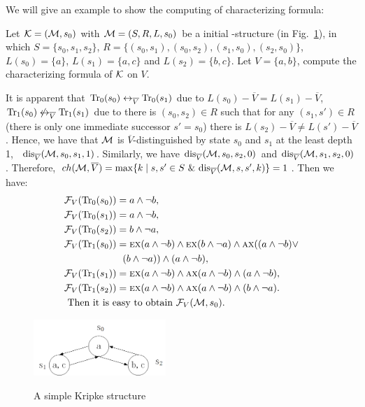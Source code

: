 \documentclass{article}
\begin{document}
We will give an example to show the computing of characterizing formula:
\begin{example}
Let ${\cal K} = ({\cal M}, s_0)$ with ${\cal M}=(S, R, L,s_0)$ be a initial \MPK-structure (in Fig.~\ref{Kripke_1}), in which $S=\{s_0, s_1, s_2\}$, $R=\{(s_0, s_1), (s_0, s_2), (s_1, s_0), (s_2, s_0)\}$, $L(s_0)= \{a\}$, $L(s_1) =\{a,c\}$ and $L(s_2) = \{b,c\}$. Let $V=\{a, b\}$, compute the characterizing formula of ${\cal K}$ on $V$.

It is apparent that $\textrm{Tr}_0(s_0) \leftrightarrow_{\overline V} \textrm{Tr}_0(s_1)$ due to $L(s_0) - \overline V = L(s_1) -\overline V$, $\textrm{Tr}_1(s_0) \not\leftrightarrow_{\overline V} \textrm{Tr}_1(s_1)$ due to there is $(s_0, s_2)\in R$ such that for any $(s_1, s') \in R$ (there is only one immediate successor $s'=s_0$) there is $L(s_2) - \overline V \neq L(s') - \overline V$. Hence, we have that ${\cal M}$ is $\overline V$-distinguished by state $s_0$ and $s_1$ at the least depth 1, \ie\ $\textrm{dis}_{\overline V}({\cal M}, s_0, s_1, 1)$. Similarly, we have $\textrm{dis}_{\overline V}({\cal M}, s_0, s_2, 0)$ and $\textrm{dis}_{\overline V}({\cal M}, s_1, s_2, 0)$. Therefore, $ch({\cal M}, \overline V) =  \max\{k\mid s,s'\in S\ \&\ \textrm{dis}_{\overline V}({\cal M},s,s',k)\} = 1$.
Then we have:
\begin{align*}
  & {\cal F}_V(\textrm{Tr}_0(s_0)) = a \wedge \neg b, \\
  & {\cal F}_V(\textrm{Tr}_0(s_1)) = a \wedge \neg b, \\
  & {\cal F}_V(\textrm{Tr}_0(s_2)) = b \wedge \neg a, \\
  & {\cal F}_V(\textrm{Tr}_1(s_0)) = \textsc{e}\textsc{x}(a \wedge \neg b)  \wedge \textsc{e}\textsc{x}(b \wedge \neg a) \wedge \textsc{a}\textsc{x}((a \wedge \neg b) \vee\\
  & \qquad \qquad  \qquad (b \wedge \neg a)) \wedge (a \wedge \neg b), \\
  & {\cal F}_V(\textrm{Tr}_1(s_1)) = \textsc{e}\textsc{x}(a \wedge \neg b)  \wedge \textsc{a}\textsc{x}(a \wedge \neg b) \wedge (a \wedge \neg b), \\
  & {\cal F}_V(\textrm{Tr}_1(s_2)) = \textsc{e}\textsc{x}(a \wedge \neg b)  \wedge \textsc{a}\textsc{x}(a \wedge \neg b) \wedge (b \wedge \neg a).\\
  & \mbox{ Then it is easy to obtain\ } {\cal F}_V({\cal M}, s_0).
\end{align*}

\begin{figure}
  \centering
  \includegraphics[width=5cm]{k1.png}\\
  \caption{A simple Kripke structure}\label{Kripke_1}
\end{figure}
\end{example}
\end{document}
